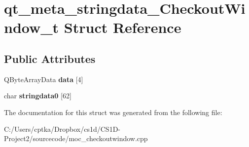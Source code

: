 \hypertarget{structqt__meta__stringdata___checkout_window__t}{}\section{qt\+\_\+meta\+\_\+stringdata\+\_\+\+Checkout\+Window\+\_\+t Struct Reference}
\label{structqt__meta__stringdata___checkout_window__t}
\subsection*{Public Attributes}
\begin{DoxyCompactItemize}
\item 
\mbox{\label{structqt__meta__stringdata___checkout_window__t_a1fb5e1706ae91ee637fbe547935f3897}} 
Q\+Byte\+Array\+Data {\bfseries data} \mbox{[}4\mbox{]}
\item 
\mbox{\label{structqt__meta__stringdata___checkout_window__t_a19677d2844dbf90d85af16da2528bd53}} 
char {\bfseries stringdata0} \mbox{[}62\mbox{]}
\end{DoxyCompactItemize}


The documentation for this struct was generated from the following file\+:\begin{DoxyCompactItemize}
\item 
C\+:/\+Users/cptka/\+Dropbox/cs1d/\+C\+S1\+D-\/\+Project2/sourcecode/moc\+\_\+checkoutwindow.\+cpp\end{DoxyCompactItemize}

